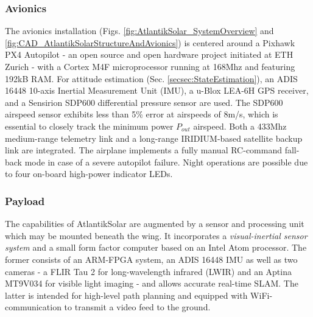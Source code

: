 \subsubsection{Avionics} \label{secsec:Avionics}
The avionics installation (Figs. \ref{fig:AtlantikSolar_SystemOverview} and \ref{fig:CAD_AtlantikSolarStructureAndAvionics}) is centered around a Pixhawk PX4 Autopilot - an open source and open hardware project initiated at ETH Zurich - with a Cortex M4F microprocessor running at 168Mhz and featuring 192kB RAM. For attitude estimation (Sec. \ref{secsec:StateEstimation}), an ADIS 16448 10-axis Inertial Measurement Unit (IMU), a u-Blox LEA-6H GPS receiver, and a Sensirion SDP600 differential pressure sensor are used. The SDP600 airspeed sensor exhibits less than 5\% error at airspeeds of 8m/s, which is essential to closely track the minimum power $P_{out}$ airspeed. Both a 433Mhz medium-range telemetry link and a long-range IRIDIUM-based satellite backup link are integrated. The airplane implements a fully manual RC-command fall-back mode in case of a severe autopilot failure. Night operations are possible due to four on-board high-power indicator LEDs.

\subsubsection{Payload}
The capabilities of AtlantikSolar are augmented by a sensor and processing unit which may be mounted beneath the wing. It incorporates a \emph{visual-inertial sensor system} \cite{nikolic2014synchronized} and a small form factor computer based on an Intel Atom processor. The former consists of an ARM-FPGA system, an ADIS 16448 IMU as well as two cameras - a FLIR Tau 2 for long-wavelength infrared (LWIR) and an Aptina MT9V034 for visible light imaging - and allows accurate real-time SLAM\cite{Leutenegger_PhD}. The latter is intended for high-level path planning and equipped with WiFi-communication to transmit a video feed to the ground.

